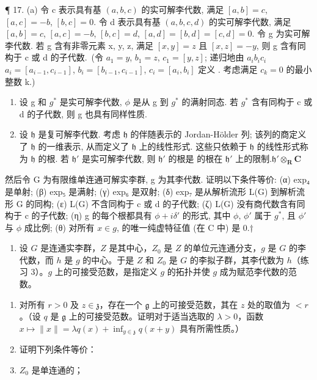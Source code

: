 ¶ 17. (a) 令 c 表示具有基 \((a, b, c)\) 的实可解李代数, 满足 \([a, b] = c\), \([a, c] = -b\), \([b, c] = 0\). 令 d 表示具有基 \((a, b, c, d)\) 的实可解李代数, 满足 \([a, b] = c\), \([a, c] = -b\), \([b, c] = d\), \([a, d] = [b, d] = [c, d] = 0\). 令 g 为实可解李代数. 若 g 含有非零元素 x, y, z, 满足 \([x, y] = z\) 且 \([x, z] = -y\), 则 g 含有同构于 c 或 d 的子代数.~(令 \(a_{1} = y\), \(b_{1} = z\), \(c_{1} = [y, z]\); 递归地由 \(a_{i}\)\(b_{i}\)\(c_{i}\)\(a_{i} = [a_{i-1}, c_{i-1}]\), \(b_{i} = [b_{i-1}, c_{i-1}]\), \(c_{i} = [a_{i}, b_{i}]\) 定义 . 考虑满足 \(c_{k} = 0\) 的最小整数 k.)

\begin{enumerate}
\def\labelenumi{(\alph{enumi})}
\setcounter{enumi}{1}
\item
  设 g 和 \(g^{*}\) 是实可解李代数, \(\phi\) 是从 g 到 \(g^{*}\) 的满射同态. 若 \(g^{*}\) 含有同构于 c 或 d 的子代数, 则 g 也具有同样性质.
\item
  设 \(\mathfrak{h}\) 是复可解李代数. 考虑 \(\mathfrak{h}\) 的伴随表示的 Jordan-Hölder 列; 该列的商定义了 \(\mathfrak{h}\) 的一维表示, 从而定义了 \(\mathfrak{h}\) 上的线性形式. 这些只依赖于 \(\mathfrak{h}\) 的线性形式称为 \(\mathfrak{h}\) 的根. 若 \(\mathfrak{h}'\) 是实可解李代数, 则 \(\mathfrak{h}'\) 的根是  的根在 \(\mathfrak{h}'\) 上的限制.\(\mathfrak{h}' \otimes_{\mathbf{R}} \mathbf{C}\)
\end{enumerate}

然后令 G 为有限维单连通可解实李群, g 为其李代数. 证明以下条件等价: (α) exp₄ 是单射; (β) exp₅ 是满射; (γ) exp₆ 是双射; (δ) exp₇ 是从解析流形 L(G) 到解析流形 G 的同构; (ε) L(G) 不含同构于 c 或 d 的子代数; (ζ) L(G) 没有商代数含有同构于 c 的子代数; (η) g 的每个根都具有 \(\phi + i\delta'\) 的形式, 其中 \(\phi\), \(\phi'\) 属于 \(g^*\), 且 \(\phi'\) 与 \(\phi\) 成比例; (θ) 对所有 \(x \in g\),  的唯一纯虚特征值 (在 C 中) 是 0.†
\relax{}

\begin{enumerate}
\def\labelenumi{\arabic{enumi}.}
\setcounter{enumi}{17}
\tightlist
\item
  设 \(G\) 是连通实李群，\(Z\) 是其中心，\(Z_0\) 是 \(Z\) 的单位元连通分支，\(g\) 是 \(G\) 的李代数，而 \(h\) 是 \(g\) 的中心。于是 \(Z\) 和 \(Z_0\) 是 \(G\) 的李拟子群，其李代数为 \(h\)（练习 3）。\(g\) 上的可接受范数，是指定义 \(g\) 的拓扑并使 \(g\) 成为赋范李代数的范数。
\end{enumerate}

\begin{enumerate}
\def\labelenumi{(\alph{enumi})}
\item
  对所有 \(r > 0\) 及 \(z \in \mathfrak{z}\)，存在一个 \(\mathfrak{g}\) 上的可接受范数，其在 \(z\) 处的取值为 \(< r\)。（设 \(q\) 是 \(\mathfrak{g}\) 上的可接受范数。证明对于适当选取的 \(\lambda > 0\)，函数 \(x \mapsto \|x\| = \lambda q(x) + \inf_{y \in \mathfrak{z}} q(x + y)\) 具有所需性质。）
\item
  证明下列条件等价：
\item
  \(Z_{0}\) 是单连通的；
\end{enumerate}

